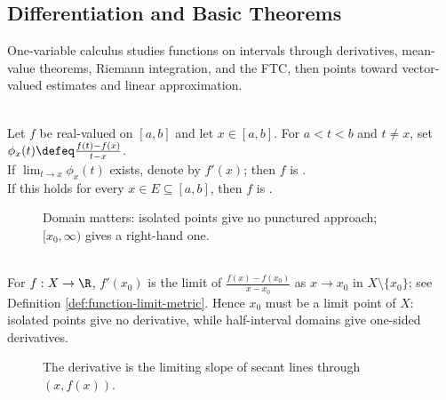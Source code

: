 \subsection{Differentiation and Basic Theorems}

%

One-variable calculus studies functions on intervals through derivatives, mean-value theorems, Riemann integration, and the FTC, then points toward vector-valued estimates and linear approximation.

\begin{definition} \label{def:derivative-real-function}\label{def:one-variable-differentiation-core-source-todo} \\
Let $f$ be real-valued on $[a,b]$ and let $x\in[a,b]$. For $a<t<b$ and $t\neq x$, set $\phi_x(t)\defeq\frac{f(t)-f(x)}{t-x}$.\\
If $\lim_{t\to x}\phi_x(t)$ exists, denote  by $f'(x)$; then $f$ is .\\
If this holds for every $x\in E\subseteq[a,b]$, then $f$ is .
\end{definition}

\begin{figure}[H]
  \centering
  
  \caption{Domain matters: isolated points give no punctured approach; $[x_0,\infty)$ gives a right-hand one.}
  \label{fig:one-variable-domain-restriction}
\end{figure}

\begin{perspective} \label{per:one-variable-domain-of-differentiability} \\
For $f:X\to\R$, $f'(x_0)$ is the limit of $\frac{f(x)-f(x_0)}{x-x_0}$ as $x\to x_0$ in $X\setminus\{x_0\}$; see Definition \ref{def:function-limit-metric}. Hence $x_0$ must be a limit point of $X$: isolated points give no derivative, while half-interval domains give one-sided derivatives.
\end{perspective}

\begin{figure}[H]
  \centering
  
  \caption{The derivative is the limiting slope of secant lines through $(x,f(x))$.}
  \label{fig:derivative-secant-to-tangent}
\end{figure}

